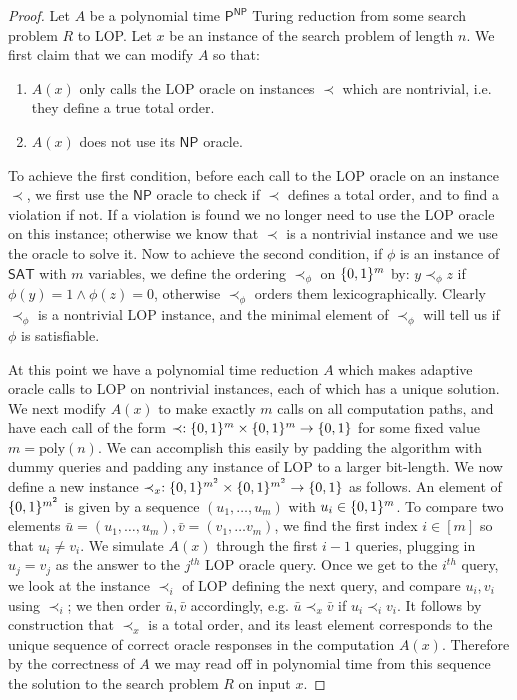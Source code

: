 \begin{proof}
Let $A$ be a polynomial time $\mathsf{P^{NP}}$ Turing reduction from some search problem $R$ to {\sc LOP}. Let $x$ be an instance of the search problem of length $n$. We first claim that we can modify $A$ so that:
\begin{enumerate}
    \item $A(x)$ only calls the {\sc LOP} oracle on instances $\prec$ which are nontrivial, i.e. they define a true total order.
    \item $A(x)$ does not use its $\mathsf{NP}$ oracle.
\end{enumerate}
To achieve the first condition, before each call to the {\sc LOP} oracle on an instance $\prec$, we first use the $\mathsf{NP}$ oracle to check if $\prec$ defines a total order, and to find a violation if not. If a violation is found we no longer need to use the {\sc LOP} oracle on this instance; otherwise we know that $\prec$ is a nontrivial instance and we use the oracle to solve it. Now to achieve the second condition, if $\phi$ is an instance of $\mathsf{SAT}$ with $m$ variables, we define the ordering $\prec_{\phi}$ on $\{0,1\}^m$ by: $y \prec_{\phi} z$ if $\phi(y) = 1 \land \phi(z)=0$, otherwise $\prec_{\phi}$ orders them lexicographically. Clearly $\prec_{\phi}$ is a nontrivial {\sc LOP} instance, and the minimal element of $\prec_{\phi}$ will tell us if $\phi$ is satisfiable.

At this point we have a polynomial time reduction $A$ which makes adaptive oracle calls to {\sc LOP} on nontrivial instances, each of which has a unique solution. We next modify $A(x)$ to make exactly $m$ calls on all computation paths, and have each call of the form $\prec: \{0,1\}^m \times \{0,1\}^m \to \{0,1\}$ for some fixed value $m = \mathrm{poly}(n)$. We can accomplish this easily by padding the algorithm with dummy queries and padding any instance of {\sc LOP} to a larger bit-length. We now define a new instance $\prec_{x}: \{0,1\}^{m^2} \times \{0,1\}^{m^2} \to \{0,1\}$ as follows. An element of $\{0,1\}^{m^2}$ is given by a sequence $(u_1,\ldots,u_m)$ with $u_i \in \{0,1\}^m$. To compare two elements $\bar{u} = (u_1,\ldots,u_m), \bar{v}= (v_1,\ldots v_m)$, we find the first index $i \in [m]$ so that $u_i \neq v_i$. We simulate $A(x)$ through the first $i-1$ queries, plugging in $u_j = v_j$ as the answer to the $j^{th}$ {\sc LOP} oracle query. Once we get to the $i^{th}$ query, we look at the instance $\prec_i$ of {\sc LOP} defining the next query, and compare $u_i, v_i$ using $\prec_i$; we then order $\bar{u},\bar{v}$ accordingly, e.g. $\bar{u} \prec_x \bar{v}$ if $u_i \prec_i v_i$. It follows by construction that $\prec_x$ is a total order, and its least element  corresponds to the unique sequence of correct oracle responses in the computation $A(x)$. Therefore by the correctness of $A$ we may read off in polynomial time from this sequence the solution to the search problem $R$ on input $x$.
\end{proof}

